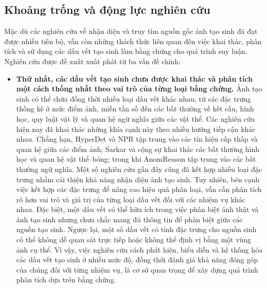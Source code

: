 \documentclass[12pt]{report}
\begin{document}
\subsection{Khoảng trống và động lực nghiên cứu}
Mặc dù các nghiên cứu về nhận diện và truy tìm nguồn gốc ảnh tạo sinh đã đạt được nhiều tiến bộ, vẫn còn những thách thức liên quan đến việc khai thác, phân tích và sử dụng các dấu vết tạo sinh làm bằng chứng cho quá trình suy luận. Nghiên cứu được đề xuất xuất phát từ ba vấn đề chính:
\begin{itemize}
    \item \textbf{Thứ nhất, các dấu vết tạo sinh chưa được khai thác và phân tích một cách thống nhất theo vai trò của từng loại bằng chứng.} Ảnh tạo sinh có thể chứa đồng thời nhiều loại dấu vết khác nhau, từ các đặc trưng thống kê ở mức điểm ảnh, miền tần số đến các bất thường về kết cấu, hình học, quy luật vật lý và quan hệ ngữ nghĩa giữa các vật thể. Các nghiên cứu hiện nay đã khai thác những khía cạnh này theo nhiều hướng tiếp cận khác nhau. Chẳng hạn, HyperDet \cite{cao2024hyperdet} và NPR \cite{tan2024rethinking} tập trung vào các tín hiệu cấp thấp và quan hệ giữa các điểm ảnh; Sarkar và cộng sự \cite{sarkar2024shadows} khai thác các bất thường hình học và quan hệ vật thể--bóng; trong khi AnomReason \cite{tan2026semantic} tập trung vào các bất thường ngữ nghĩa. Một số nghiên cứu gần đây cũng đã kết hợp nhiều loại đặc trưng nhằm cải thiện khả năng nhận diện ảnh tạo sinh. Tuy nhiên, bên cạnh việc kết hợp các đặc trưng để nâng cao hiệu quả phân loại, vẫn cần phân tích rõ hơn vai trò và giá trị của từng loại dấu vết đối với các nhiệm vụ khác nhau. Đặc biệt, một dấu vết có thể hữu ích trong việc phân biệt ảnh thật và ảnh tạo sinh nhưng chưa chắc mang đủ thông tin để phân biệt giữa các nguồn tạo sinh. Ngược lại, một số dấu vết có tính đặc trưng cho nguồn sinh có thể không dễ quan sát trực tiếp hoặc không thể định vị bằng một vùng ảnh cụ thể. Vì vậy, việc nghiên cứu cách phát hiện, biểu diễn và hệ thống hóa các dấu vết tạo sinh ở nhiều mức độ, đồng thời đánh giá khả năng đóng góp của chúng đối với từng nhiệm vụ, là cơ sở quan trọng để xây dựng quá trình phân tích dựa trên bằng chứng.


\end{itemize}
\end{document}
